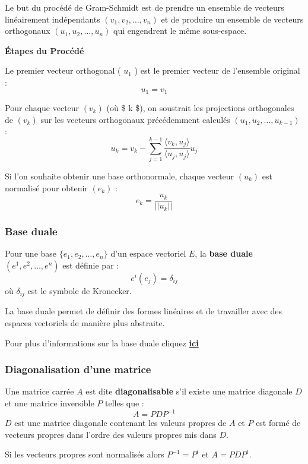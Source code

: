 \documentclass[
  letterpaper,
  DIV=11,
  numbers=noendperiod]{scrartcl}
\begin{document}
Le but du procédé de Gram-Schmidt est de prendre un ensemble de vecteurs
linéairement indépendants \(( {v_1, v_2, \ldots, v_n})\) et de produire
un ensemble de vecteurs orthogonaux \(( {u_1, u_2, \ldots, u_n} )\) qui
engendrent le même sous-espace.

\textbf{Étapes du Procédé}

Le premier vecteur orthogonal ( \(u_1\) ) est le premier vecteur de
l'ensemble original : \[u_1 = v_1\]

Pour chaque vecteur \(( v_k )\) (où \$ k  \$), on soustrait les
projections orthogonales de \(( v_k )\) sur les vecteurs orthogonaux
précédemment calculés \(( u_1, u_2, \ldots, u_{k-1})\) :
\[ u_k = v_k - \sum_{j=1}^{k-1} \frac{\langle v_k, u_j \rangle}{\langle u_j, u_j \rangle} u_j \]

Si l'on souhaite obtenir une base orthonormale, chaque vecteur
\(( u_k )\) est normalisé pour obtenir \(( e_k )\) :
\[ e_k = \frac{u_k}{||u_k||} \]

\subsubsection{Base duale}\label{base-duale}

Pour une base \(\{e_1, e_2, \ldots, e_n\}\) d'un espace vectoriel \(E\),
la \textbf{base duale} \((e^1, e^2, \ldots, e^n)\) est définie par :
\[e^i(e_j) = \delta_{ij}\] où \(\delta_{ij}\) est le symbole de
Kronecker.

La base duale permet de définir des formes linéaires et de travailler
avec des espaces vectoriels de manière plus abstraite.

Pour plus d'informations sur la base duale cliquez
\href{https://www.math.univ-paris13.fr/~schwartz/L2/dual.pdf}{\textbf{ici}}

\subsubsection{Diagonalisation d'une
matrice}\label{diagonalisation-dune-matrice}

Une matrice carrée \(A\) est dite \textbf{diagonalisable} s'il existe
une matrice diagonale \(D\) et une matrice inversible \(P\) telles que :
\[A = PDP^{-1}\] \(D\) est une matrice diagonale contenant les valeurs
propres de \(A\) et \(P\) est formé de vecteurs propres dans l'ordre des
valeurs propres mis dans \(D\).

\begin{tcolorbox}[enhanced jigsaw, rightrule=.15mm, bottomrule=.15mm, opacitybacktitle=0.6, leftrule=.75mm, colbacktitle=quarto-callout-tip-color!10!white, colback=white, opacityback=0, toprule=.15mm, left=2mm, title=\textcolor{quarto-callout-tip-color}{\faLightbulb}\hspace{0.5em}{Tip}, breakable, bottomtitle=1mm, colframe=quarto-callout-tip-color-frame, toptitle=1mm, titlerule=0mm, coltitle=black, arc=.35mm]

Si les vecteurs propres sont normalisés alors \(P^{-1} = P^t\) et
\(A = PDP^t\).

\end{tcolorbox}
\end{document}
